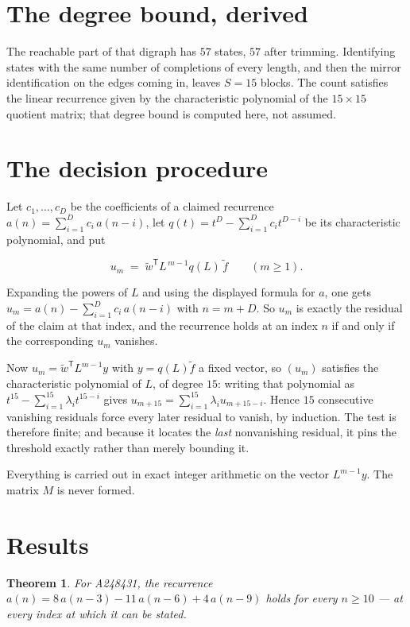 \documentclass[11pt]{article}
\newtheorem{theorem}{Theorem}
\theoremstyle{definition}
\begin{document}
\section{The degree bound, derived}

The reachable part of that digraph has $57$ states, $57$ after trimming. Identifying states with the same number of completions of every length, and then the mirror identification on the edges coming in, leaves $S = 15$ blocks. The count satisfies the linear recurrence given by the characteristic polynomial of the $15\times15$ quotient matrix; that degree bound is computed here, not assumed.

\section{The decision procedure}

Let $c_1,\dots,c_D$ be the coefficients of a claimed recurrence $a(n) = \sum_{i=1}^{D} c_i\,a(n-i)$, let $q(t) = t^{D} - \sum_{i=1}^{D} c_i t^{D-i}$ be its characteristic polynomial, and put

\[u_m \;=\; \tilde w^{\mathsf T} L^{\,m-1} q(L)\,\tilde f \qquad (m \ge 1).\]

Expanding the powers of $L$ and using the displayed formula for $a$, one gets $u_m = a(n) - \sum_{i=1}^{D} c_i\,a(n-i)$ with $n = m + D$. So $u_m$ is exactly the residual of the claim at that index, and the recurrence holds at an index $n$ if and only if the corresponding $u_m$ vanishes.

Now $u_m = \tilde w^{\mathsf T} L^{m-1} y$ with $y = q(L)\tilde f$ a fixed vector, so $(u_m)$ satisfies the characteristic polynomial of $L$, of degree $15$: writing that polynomial as $t^{15} - \sum_{i=1}^{15} \lambda_i t^{15-i}$ gives $u_{m+15} = \sum_{i=1}^{15} \lambda_i u_{m+15-i}$. Hence $15$ consecutive vanishing residuals force every later residual to vanish, by induction. The test is therefore finite; and because it locates the {\itshape last} nonvanishing residual, it pins the threshold exactly rather than merely bounding it.

Everything is carried out in exact integer arithmetic on the vector $L^{m-1}y$. The matrix $M$ is never formed.

\section{Results}

\begin{theorem} For A248431, the recurrence $a(n) = 8\,a(n-3) - 11\,a(n-6) + 4\,a(n-9)$ holds for every $n \ge 10$ --- at every index at which it can be stated.\end{theorem}
\end{document}
